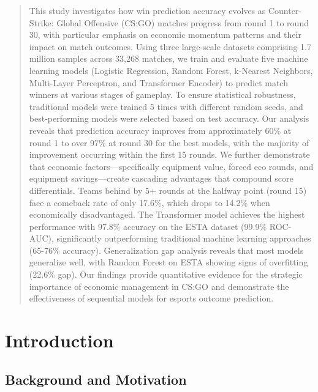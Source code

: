 \documentclass[11pt]{article}
\begin{document}
\begin{titlepage}
    \begin{quote}
        This study investigates how win prediction accuracy evolves as Counter-Strike: Global Offensive (CS:GO) matches progress from round 1 to round 30, with particular emphasis on economic momentum patterns and their impact on match outcomes. Using three large-scale datasets comprising 1.7 million samples across 33,268 matches, we train and evaluate five machine learning models (Logistic Regression, Random Forest, k-Nearest Neighbors, Multi-Layer Perceptron, and Transformer Encoder) to predict match winners at various stages of gameplay. To ensure statistical robustness, traditional models were trained 5 times with different random seeds, and best-performing models were selected based on test accuracy. Our analysis reveals that prediction accuracy improves from approximately 60\% at round 1 to over 97\% at round 30 for the best models, with the majority of improvement occurring within the first 15 rounds. We further demonstrate that economic factors---specifically equipment value, forced eco rounds, and equipment savings---create cascading advantages that compound score differentials. Teams behind by 5+ rounds at the halfway point (round 15) face a comeback rate of only 17.6\%, which drops to 14.2\% when economically disadvantaged. The Transformer model achieves the highest performance with 97.8\% accuracy on the ESTA dataset (99.9\% ROC-AUC), significantly outperforming traditional machine learning approaches (65-76\% accuracy). Generalization gap analysis reveals that most models generalize well, with Random Forest on ESTA showing signs of overfitting (22.6\% gap). Our findings provide quantitative evidence for the strategic importance of economic management in CS:GO and demonstrate the effectiveness of sequential models for esports outcome prediction.
    \end{quote}

\end{titlepage}

\tableofcontents
\newpage

\section{Introduction}
\label{sec:introduction}

\subsection{Background and Motivation}
\end{document}
